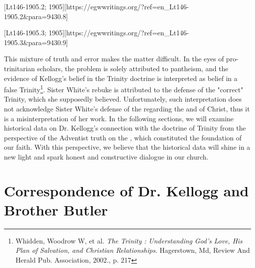 [Lt146-1905.2; 1905][https://egwwritings.org/?ref=en\_Lt146-1905.2&para=9430.8]

[Lt146-1905.3; 1905][https://egwwritings.org/?ref=en\_Lt146-1905.3&para=9430.9]

This mixture of truth and error makes the matter difficult. In the eyes of pro-trinitarian scholars, the problem is solely attributed to pantheism, and the evidence of Kellogg's belief in the Trinity doctrine is interpreted as belief in a false Trinity\footnote{Whidden, Woodrow W, et al. \textit{The Trinity : Understanding God's Love, His Plan of Salvation, and Christian Relationships}. Hagerstown, Md, Review And Herald Pub. Association, 2002., p. 217}. Sister White's rebuke is attributed to the defense of the "correct" Trinity, which she supposedly believed. Unfortunately, such interpretation does not acknowledge Sister White's defense of the  regarding the  and of Christ, thus it is a misinterpretation of her work. In the following sections, we will examine historical data on Dr. Kellogg's connection with the doctrine of Trinity from the perspective of the Adventist truth on the , which constituted the foundation of our faith. With this perspective, we believe that the historical data will shine in a new light and spark honest and constructive dialogue in our church.

\section*{Correspondence of Dr. Kellogg and Brother Butler}

